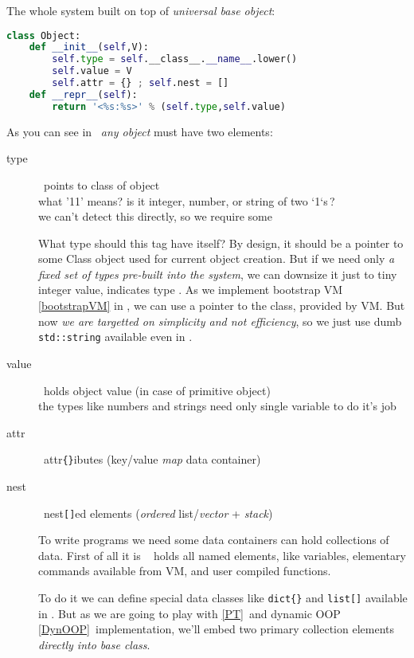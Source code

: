 \label{Object}\secdown

The whole system built on top of \emph{universal base object}: 

\begin{lstlisting}[language=Python]
class Object:
	def __init__(self,V):
		self.type = self.__class__.__name__.lower()
		self.value = V
		self.attr = {} ; self.nest = []
	def __repr__(self):
		return '<%s:%s>' % (self.type,self.value)
\end{lstlisting}

\noindent
As you can see in \cite{budd}\ \emph{any object} must have two elements:
\begin{description}%
\item[type]\ points to class of object\\
what '11' means? is it integer, number, or string of two `1`s\,?\\
we can't detect this directly, so we require some 

What type should this tag have itself? By design, it should be a pointer to some
Class object used for current object creation. But if we need only \emph{a fixed
set of types pre-built into the system}, we can downsize it just to tiny integer
value, indicates type \cite{STFPGA}. As we implement bootstrap VM
\ref{bootstrapVM} in \py, we can use a pointer to the class, provided by \py
VM. But now \emph{we are targetted on simplicity and not efficiency}, so we just
use dumb \verb|std::string| available even in \cpp.

\item[value]\ holds object value (in case of primitive object)\ \\
the  types like numbers and strings need only single variable to
do it's job

\item[attr]\ attr\verb|{}|ibutes (key/value \emph{map} data container)
\item[nest]\ nest\verb|[]|ed elements (\textit{ordered} list/\emph{vector} +
\emph{stack})

To write programs we need some  data containers can hold
collections of data. First of all it is \F\  holds all named
elements, like variables, elementary commands available from VM, and user
compiled functions.

To do it we can define special data classes like \verb|dict{}| and \verb|list[]|
available in \py. But as we are going to play with  \ref{PT}\ and dynamic OOP \ref{DynOOP}\ implementation, we'll
embed two primary collection elements \emph{directly into base class}.
 
\end{description}


